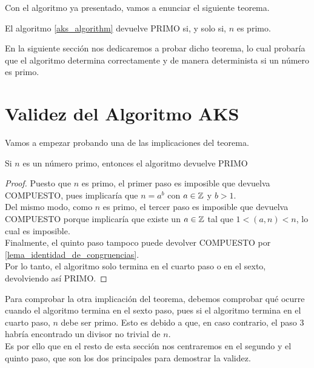 Con el algoritmo ya presentado, vamos a enunciar el siguiente teorema.

\begin{teorema}\label{validez_algoritmo_aks}
	El algoritmo \ref{aks_algorithm} devuelve PRIMO si, y solo si, $n$ es primo.
\end{teorema}

En la siguiente sección nos dedicaremos a probar dicho teorema, lo cual probaría que el algoritmo determina correctamente y de manera determinista si un número es primo.

\section{Validez del Algoritmo AKS}

Vamos a empezar probando una de las implicaciones del teorema.

\begin{lema}\label{devuelve_PRIMO_si_n_primo}
	Si $n$ es un número primo, entonces el algoritmo devuelve PRIMO
\end{lema}

\begin{proof}
	Puesto que $n$ es primo, el primer paso es imposible que devuelva COMPUESTO, pues implicaría que $n = a^b$ con $a \in \mathbb{Z}$ y $b > 1$.\\
	
	Del mismo modo, como $n$ es primo, el tercer paso es imposible que devuelva COMPUESTO porque implicaría que existe un $a \in \mathbb{Z}$ tal que $1 < (a, n) < n$, lo cual es imposible.\\
	
	Finalmente, el quinto paso tampoco puede devolver COMPUESTO por \autoref{lema_identidad_de_congruencias}.\\
	
	Por lo tanto, el algoritmo solo termina en el cuarto paso o en el sexto, devolviendo así PRIMO.
\end{proof}

Para comprobar la otra implicación del teorema, debemos comprobar qué ocurre cuando el algoritmo termina en el sexto paso, pues si el algoritmo termina en el cuarto paso, $n$ debe ser primo. Esto es debido a que, en caso contrario, el paso $3$ habría encontrado un divisor no trivial de $n$.\\

Es por ello que en el resto de esta sección nos centraremos en el segundo y el quinto paso, que son los dos principales para demostrar la validez.\\

